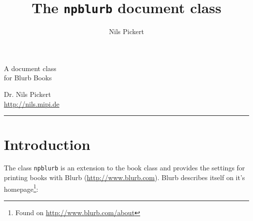 \documentclass[english,10pt,bbook=pocketbig,inner=1cm,outer=2.5cm]{npblurb}
\title{The {\tt npblurb} document class}
\author{Nils Pickert}
\date{}
\newcommand{\HRule}[1]{\hfill \rule{0.2\linewidth}{#1}} %
\begin{document}
\begin{titlepage}

\colorbox{headcolor4}{
	\parbox[t]{\linewidth}{
	\begin{center}
		\Huge\fancyfont\color{headcolor1}
		\vspace*{1.4cm} %
		
		A document class \\
		for Blurb Books
		
		\vspace*{4cm} %
	\end{center}
	}
}


\vfill %


{\centering \large 
\hfill Dr. Nils Pickert \\
\hfill \url{http://nils.mipi.de} \\

\HRule{1pt}} %


\clearpage %
\end{titlepage}

\tableofcontents
\chapter{Introduction}
The class {\tt npblurb} is an extension to the book class and provides the settings for printing books with Blurb (\url{http://www.blurb.com}). Blurb describes itself on it's homepage\footnote{Found on \url{http://www.blurb.com/about}}:
\end{document}
